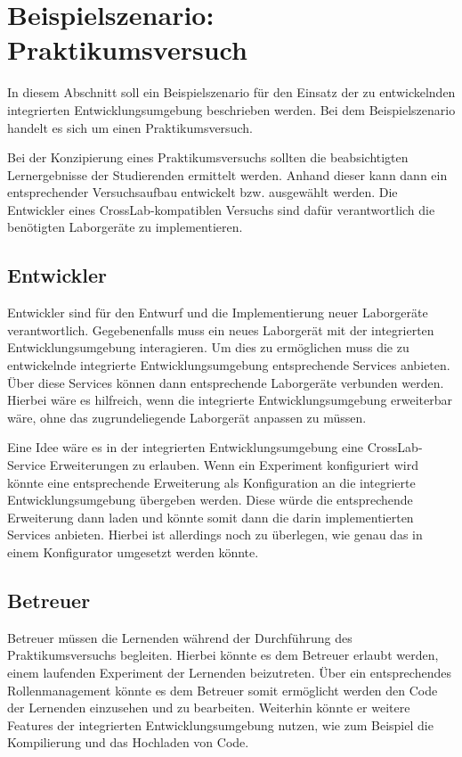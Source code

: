 \section{Beispielszenario: Praktikumsversuch}\label{section:anforderungsanalyse:beispielszenario}

In diesem Abschnitt soll ein Beispielszenario für den Einsatz der zu entwickelnden integrierten Entwicklungsumgebung beschrieben werden. Bei dem Beispielszenario handelt es sich um einen Praktikumsversuch.

Bei der Konzipierung eines Praktikumsversuchs sollten die beabsichtigten Lernergebnisse der Studierenden ermittelt werden. Anhand dieser kann dann ein entsprechender Versuchsaufbau entwickelt bzw. ausgewählt werden. Die Entwickler eines CrossLab-kompatiblen Versuchs sind dafür verantwortlich die benötigten Laborgeräte zu implementieren.

\subsection{Entwickler}

Entwickler sind für den Entwurf und die Implementierung neuer Laborgeräte verantwortlich. Gegebenenfalls muss ein neues Laborgerät mit der integrierten Entwicklungsumgebung interagieren. Um dies zu ermöglichen muss die zu entwickelnde integrierte Entwicklungsumgebung entsprechende Services anbieten. Über diese Services können dann entsprechende Laborgeräte verbunden werden. Hierbei wäre es hilfreich, wenn die integrierte Entwicklungsumgebung erweiterbar wäre, ohne das zugrundeliegende Laborgerät anpassen zu müssen.

\begin{note}
    Eine Idee wäre es in der integrierten Entwicklungsumgebung eine CrossLab-Service Erweiterungen zu erlauben. Wenn ein Experiment konfiguriert wird könnte eine entsprechende Erweiterung als Konfiguration an die integrierte Entwicklungsumgebung übergeben werden. Diese würde die entsprechende Erweiterung dann laden und könnte somit dann die darin implementierten Services anbieten. Hierbei ist allerdings noch zu überlegen, wie genau das in einem Konfigurator umgesetzt werden könnte.
\end{note}

\subsection{Betreuer}

Betreuer müssen die Lernenden während der Durchführung des Praktikumsversuchs begleiten. Hierbei könnte es dem Betreuer erlaubt werden, einem laufenden Experiment der Lernenden beizutreten. Über ein entsprechendes Rollenmanagement könnte es dem Betreuer somit ermöglicht werden den Code der Lernenden einzusehen und zu bearbeiten. Weiterhin könnte er weitere Features der integrierten Entwicklungsumgebung nutzen, wie zum Beispiel die Kompilierung und das Hochladen von Code.

